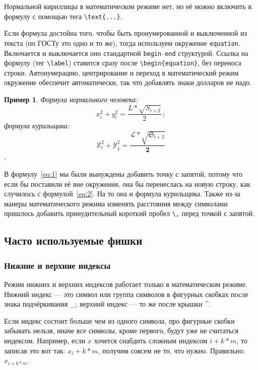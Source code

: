 \documentclass[14pt,russian]{scrartcl}
\newcounter{cExample}
\newtheorem{Example}{Пример}[cExample]
\begin{document}
Нормальной кириллицы в математическом режиме нет, но её можно включить в формулу с помощью тега \texttt{\textbackslash text\{...\}}. 

Если формула достойна того, чтобы быть пронумерованной и выключенной из текста (по ГОСТу это одно и то же), тогда используем окружение \texttt{equation}. Включается и выключается оно стандартной \texttt{begin}--\texttt{end} структурой. Ссылка на формулу (тег \texttt{\textbackslash label}) ставится сразу после \texttt{\textbackslash begin\{equation\}}, без переноса строки. Автонумерацию, центрирование и переход в математический режим окружение обеспечит автоматически, так что добавлять знаки долларов не надо.

\begin{Example}\label{Example:MathFont2}
Формула нормального человека: 
\begin{equation}\label{eq:1}
x_i^2 + y^2_i = \frac{L*\sqrt{S_{i+2}}}{2}\,;
\end{equation} 
формула курильщика: 
\begin{equation}\label{eq:2}
\mathbb{X}_\mathfrak{i}^\mathfrak{2} + \mathcal{Y}^\mathit{2}_\mathtt{i} = \frac{\mathscr{L}*\sqrt{\mathfrak{S}_\mathfrak{i+2}}}{\mathbf{2}}
\end{equation}.
\end{Example} 

В формулу~\ref{eq:1} мы были вынуждены добавить точку с запятой, потому что если бы поставили её вне окружения, она бы перенеслась на новую строку, как случилось с формулой~\ref{eq:2}. На то она и формула курильщика. Также из-за манеры математического режима изменять расстояния между символами пришлось добавить принудительный короткий пробел \texttt{\textbackslash ,} перед точкой с запятой. 

\subsection{Часто используемые фишки}
\subsubsection{Нижние и верхние индексы}

Режим нижних и верхних индексов работает только в математическом режиме. Нижний индекс --- это символ или группа символов в фигурных скобках после знака подчёркивания \_; верхний индекс --- то же после крышки \^{}.

Если индекс состоит больше чем из одного символа, про фигурные скобки забывать нельзя, иначе все символы, кроме первого, будут уже не считаться индексом. Например, если $x$ хочется снабдить сложным индексом $i+k*m$, то записав это вот так: $x_i+k*m$, получим совсем не то, что нужно. Правильно: $x_{i+k*m}$.
\end{document}
